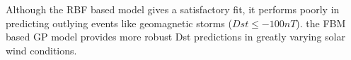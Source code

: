 \documentclass[landscape,a0b,final]{a0poster}
\newenvironment{poster}{
  \begin{center}
  \begin{minipage}[c]{0.85\textwidth}
}{
  \end{minipage} 
  \end{center}
}
\begin{document}
\begin{poster}
\begin{multicols}{2}
\vspace{\baselineskip}
Although the RBF based model gives a satisfactory fit, it performs poorly in predicting outlying events like geomagnetic storms ($Dst \leq -100 nT$). the FBM based GP model provides more robust Dst predictions in greatly varying solar wind conditions. 


\end{multicols}

\end{poster}
\end{document}
